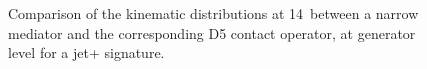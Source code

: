 \begin{figure}[hbpt!]
	\centering
	\caption{Comparison of the kinematic distributions at 14~\tev between a narrow \schannel mediator and the
	corresponding D5 contact operator, at generator level for a jet+\MET{} signature. 
	\label{fig:EFT_kinematics}}
\end{figure}
